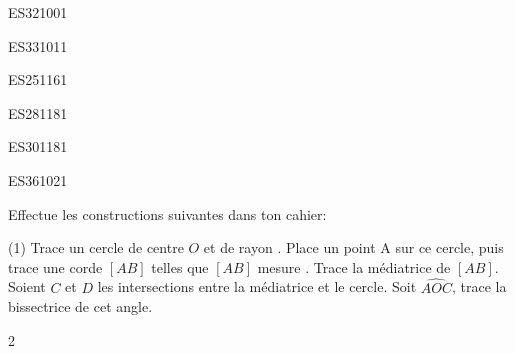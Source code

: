 \documentclass[a4paper,11pt]{report}
\begin{document}
\begin{exol}{ES32}{100}{1}
\end{exol}

\begin{exol}{ES33}{101}{1}
\end{exol}

\begin{exof}{ES25}{116}{1}
\end{exof}

\begin{exof}{ES28}{118}{1}
\end{exof}

\begin{exof}{ES30}{118}{1}
\end{exof}





%    

\begin{exol}{ES36}{102}{1}
\end{exol}



\begin{exo}
    {Effectue les constructions suivantes dans ton cahier:
    \begin{tasks}(1)
	    \task Trace un cercle de centre $O$ et de rayon .
	\task Place un point A sur ce cercle, puis trace une corde $[AB]$ telles que $[AB]$ mesure .
        \task Trace la médiatrice de $[AB]$. Soient $C$ et $D$ les intersections entre la médiatrice et le cercle.
        \task Soit $\widehat{AOC}$, trace la bissectrice de cet angle.
    \end{tasks} 
    }
 {2}   
\end{exo}
\end{document}
